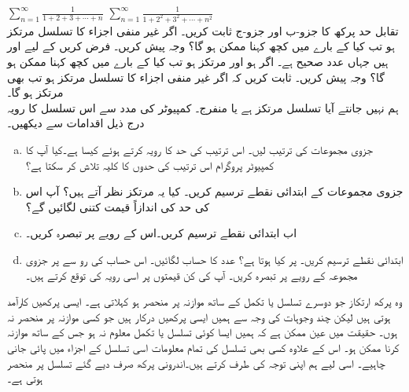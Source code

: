 $\sum\limits_{n=1}^{\infty}\frac{1}{1+2+3+\cdots+n}$
$\sum\limits_{n=1}^{\infty}\frac{1}{1+2^2+3^2+\cdots+n^2}$
\\
تقابل حد پرکھ کا جزو-ب اور جزو-ج ثابت کریں۔ 
اگر غیر منفی اجزاء کا تسلسل  مرتکز ہو تب کیا  کے بارے میں کچھ کہنا ممکن ہو گا؟ وجہ پیش کریں۔
فرض کریں   کے لیے  اور  ہیں جہاں  عدد صحیح ہے۔ اگر  ہو اور  مرتکز ہو تب کیا  کے بارے میں کچھ کہنا ممکن ہو گا؟ وجہ پیش کریں۔
ثابت کریں کہ اگر غیر منفی اجزاء کا تسلسل  مرتکز ہو تب  بھی مرتکز ہو گا۔
\\
ہم نہیں جانتے   آیا تسلسل  مرتکز   ہے یا منفرج۔ کمپیوٹر کی مدد سے اس تسلسل کا رویہ درج ذیل اقدامات  سے دیکھیں۔
\begin{enumerate}[a.]
\item
جزوی مجموعات  کی ترتیب لیں۔ اس ترتیب کی حد کا رویہ  کرتے ہوئے  کیسا ہے۔کیا آپ کا کمپیوٹر پروگرام اس ترتیب کی   حدوں کا کلیہ تلاش کر سکتا ہے؟
\item
جزوی مجموعات کے ابتدائی  نقطے  ترسیم کریں۔  کیا یہ مرتکز نظر آتے ہیں؟ آپ اس کی  حد  کی اندازاً   قیمت  کتنی لگائیں گے؟
\item
اب ابتدائی  نقطے   ترسیم کریں۔اس کے رویے  پر تبصرہ کریں۔
\item
ابتدائی  نقطے   ترسیم کریں۔  پر کیا ہوتا ہے؟ عدد  کا حساب لگائیں۔ اس حساب کی رو سے  پر جزوی مجموعہ کے رویے  پر تبصرہ کریں۔ آپ  کی کن قیمتوں پر اسی رویہ کی توقع کرتے ہیں۔  
\end{enumerate}



وہ پرکھ ارتکاز  جو دوسرے تسلسل یا تکمل کے ساتھ موازنہ پر منحصر ہو  کہلاتی ہے۔ ایسی  پرکھیں  کارآمد ہوتی  ہیں لیکن چند وجوہات کی وجہ سے ہمیں ایسی  پرکھیں  درکار ہیں جو کسی موازنہ پر منحصر نہ ہوں۔ حقیقت میں عین ممکن ہے کہ ہمیں ایسا کوئی تسلسل یا تکمل معلوم نہ ہو جس کے ساتھ موازنہ کرنا ممکن ہو۔ اس کے علاوہ کسی بھی تسلسل کی تمام معلومات اسی  تسلسل کے اجزاء میں پائی جانی چاہیے۔ اسی لیے ہم اپنی توجہ  کی طرف  کرتے ہیں۔اندرونی پرکھ صرف دیے گئے تسلسل پر منحصر ہوتی  ہے۔

